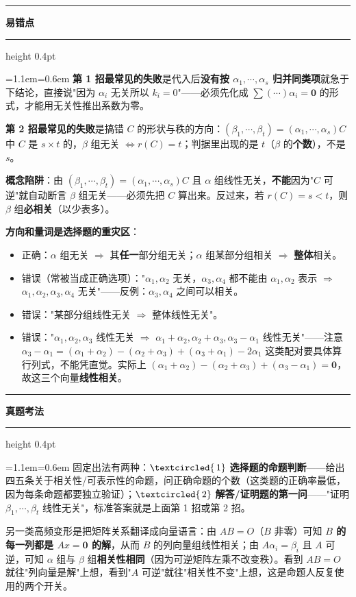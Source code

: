 \documentclass[11pt,openany,UTF8]{ctexbook}
\newcommand{\circled}[1]{\textcircled{\scriptsize\,#1}}
\newcommand{\callouthead}[2]{%
  \par\addvspace{7pt}\noindent
  {\color{#1}\rule[-0.15em]{3pt}{1.05em}}\hspace{0.5em}%
  {\bfseries\color{#1}#2}\par\nobreak\vspace{-0.35em}%
  {\color{rulesep}\hrule height 0.4pt}\nobreak\vspace{0.45em}%
  \begingroup\small\setlength{\parindent}{0pt}%
  \leftskip=1.1em\rightskip=0.6em\noindent\ignorespaces}
\newcommand{\calloutend}{\par\endgroup\addvspace{7pt}}
\newenvironment{callwarn}[1]{\callouthead{warnbar}{#1}}{\calloutend}
\newenvironment{callexam}[1]{\callouthead{exambar}{#1}}{\calloutend}
\begin{document}
\begin{callwarn}{易错点}
\textbf{第 1 招最常见的失败}是代入后\textbf{没有按 $\alpha_1,\cdots,\alpha_s$ 归并同类项}就急于下结论，直接说"因为 $\alpha_i$ 无关所以 $k_i=0$"——必须先化成 $\sum(\cdots)\alpha_i=\mathbf{0}$ 的形式，才能用无关性推出系数为零。

\textbf{第 2 招最常见的失败}是搞错 $C$ 的形状与秩的方向：$(\beta_1,\cdots,\beta_t)=(\alpha_1,\cdots,\alpha_s)C$ 中 $C$ 是 $s\times t$ 的，$\beta$ 组无关 $\iff r(C)=t$；判据里出现的是 $t$（$\beta$ 的\textbf{个数}），不是 $s$。

\textbf{概念陷阱}：由 $(\beta_1,\cdots,\beta_t)=(\alpha_1,\cdots,\alpha_s)C$ 且 $\alpha$ 组线性无关，\textbf{不能}因为"$C$ 可逆"就自动断言 $\beta$ 组无关——必须先把 $C$ 算出来。反过来，若 $r(C)=s<t$，则 $\beta$ 组\textbf{必相关}（以少表多）。

\textbf{方向和量词是选择题的重灾区}：

\begin{itemize}
\item 正确：$\alpha$ 组无关 $\Rightarrow$ 其\textbf{任一}部分组无关；$\alpha$ 组某部分组相关 $\Rightarrow$ \textbf{整体}相关。
\item 错误（常被当成正确选项）："$\alpha_1,\alpha_2$ 无关，$\alpha_3,\alpha_4$ 都不能由 $\alpha_1,\alpha_2$ 表示 $\Rightarrow$ $\alpha_1,\alpha_2,\alpha_3,\alpha_4$ 无关"——反例：$\alpha_3,\alpha_4$ 之间可以相关。
\item 错误："某部分组线性无关 $\Rightarrow$ 整体线性无关"。
\item 错误："$\alpha_1,\alpha_2,\alpha_3$ 线性无关 $\Rightarrow$ $\alpha_1+\alpha_2,\alpha_2+\alpha_3,\alpha_3-\alpha_1$ 线性无关"——注意 $\alpha_3-\alpha_1=(\alpha_1+\alpha_2)-(\alpha_2+\alpha_3)+(\alpha_3+\alpha_1)-2\alpha_1$ 这类配对要具体算行列式，不能凭直觉。实际上 $(\alpha_1+\alpha_2)-(\alpha_2+\alpha_3)+(\alpha_3-\alpha_1)=\mathbf{0}$，故这三个向量\textbf{线性相关}。
\end{itemize}
\end{callwarn}

\begin{callexam}{真题考法}
固定出法有两种：$\circled{1}$ \textbf{选择题的命题判断}——给出四五条关于相关性/可表示性的命题，问正确命题的个数（这类题的正确率最低，因为每条命题都要独立验证）；$\circled{2}$ \textbf{解答/证明题的第一问}——"证明 $\beta_1,\cdots,\beta_t$ 线性无关"，标准答案就是上面第 1 招或第 2 招。

另一类高频变形是把矩阵关系翻译成向量语言：由 $AB=O$（$B$ 非零）可知 \textbf{$B$ 的每一列都是 $Ax=\mathbf{0}$ 的解}，从而 $B$ 的列向量组线性相关；由 $A\alpha_i=\beta_i$ 且 $A$ 可逆，可知 $\alpha$ 组与 $\beta$ 组\textbf{相关性相同}（因为可逆矩阵左乘不改变秩）。看到 $AB=O$ 就往"列向量是解"上想，看到"$A$ 可逆"就往"相关性不变"上想，这是命题人反复使用的两个开关。

\end{callexam}
\end{document}
